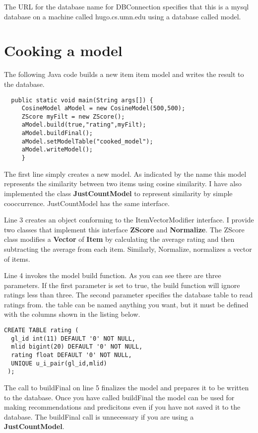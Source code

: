 \documentclass[12pt]{article}
\begin{document}
The URL for the database name for DBConnection specifies that this is
a mysql database on a machine called hugo.cs.umn.edu using a database
called model.

\section{Cooking a model}
\label{sec:cook}
The following Java code builds a new item item model and writes the
result to the database. 
\lstset{language=Java,numbers=left}
\begin{lstlisting}
  public static void main(String args[]) {
     CosineModel aModel = new CosineModel(500,500);
     ZScore myFilt = new ZScore();
     aModel.build(true,"rating",myFilt);
     aModel.buildFinal();
     aModel.setModelTable("cooked_model");
     aModel.writeModel();
     } 
\end{lstlisting}
The first line simply creates a new model.  As indicated by the name
this model represents the similarity between two items using cosine
similarity. I have also implemented the class \textbf{JustCountModel}
to represent similarity by simple cooccurrence.  JustCountModel has
the same interface.

Line 3 creates an object conforming to the ItemVectorModifier
interface.  I provide two classes that implement this interface
\textbf{ZScore} and \textbf{Normalize}.  The ZScore class modifies a
\textbf{Vector} of \textbf{Item} by calculating the average rating and
then subtracting the average from each item.  Similarly, Normalize,
normalizes a vector of items.

Line 4 invokes the model build function.  As you can see there are
three parameters.  If the first parameter is set to true, the build
function will ignore ratings less than three.  The second parameter
specifies the database table to read ratings from.  the table can be
named anything you want, but it must be defined with the columns shown
in the listing below.

\lstset{language=SQL}
\begin{lstlisting}
CREATE TABLE rating (
  gl_id int(11) DEFAULT '0' NOT NULL,
  mlid bigint(20) DEFAULT '0' NOT NULL,
  rating float DEFAULT '0' NOT NULL,
  UNIQUE u_i_pair(gl_id,mlid)
 );
\end{lstlisting}

The call to buildFinal on line 5 finalizes the model and prepares it
to be written to the database. Once you have called buildFinal the
model can be used for making recommendations and predicitons even if
you have not saved it to the database. The buildFinal call is
unnecessary if you are using a \textbf{JustCountModel}.
\end{document}
